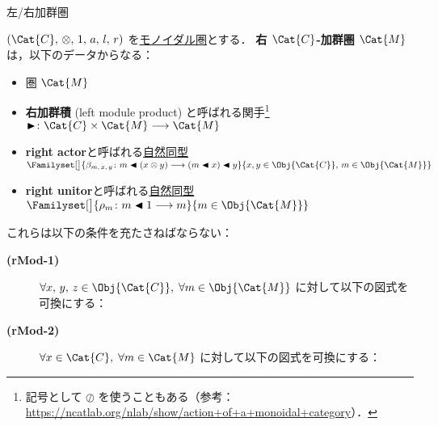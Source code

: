 \documentclass[TQFT_main]{subfiles}
\begin{document}
\begin{mydef}[label=def:modulecat,breakable]{左/右加群圏}
\begin{description}
    \end{description}

    \tcblower

    $(\Cat{C},\, \otimes,\, 1,\, a,\, l,\, r)$ を\hyperref[redef:monoidal-category]{モノイダル圏}とする．
    \textbf{右 $\Cat{C}$-加群圏} $\Cat{M}$ は，以下のデータからなる：
    \begin{itemize}
        \item 圏 $\Cat{M}$
        \item \textbf{右加群積} (left module product) と呼ばれる関手\footnote{記号として $\oslash$ を使うこともある（参考：\url{https://ncatlab.org/nlab/show/action+of+a+monoidal+category}）．} $\btr \colon \Cat{C} \times \Cat{M} \lto \Cat{M}$
        \item \textbf{right actor}と呼ばれる\hyperref[def:nat]{自然同型} $\Familyset[\big]{\beta_{m,\, x,\, y} \colon m \btl (x \otimes y) \lto (m \btl x) \btl y}{x,y \in \Obj{\Cat{C}},\, m \in \Obj{\Cat{M}}}$
        \item \textbf{right unitor}と呼ばれる\hyperref[def:nat]{自然同型} $\Familyset[\big]{\rho_{m} \colon m \btl 1 \lto m}{m \in \Obj{\Cat{M}}}$
    \end{itemize}
    これらは以下の条件を充たさねばならない：
    \begin{description}
        \item[\textbf{(rMod-1)}] $\forall x,\,y,\, z \in \Obj{\Cat{C}},\; \forall m \in \Obj{\Cat{M}}$ に対して以下の図式を可換にする：
        \item[\textbf{(rMod-2)}] $\forall x \in \Cat{C},\; \forall m \in \Cat{M}$ に対して以下の図式を可換にする：
        \begin{center}
        \end{center}
    \end{description}
    
\end{mydef}
\end{document}

